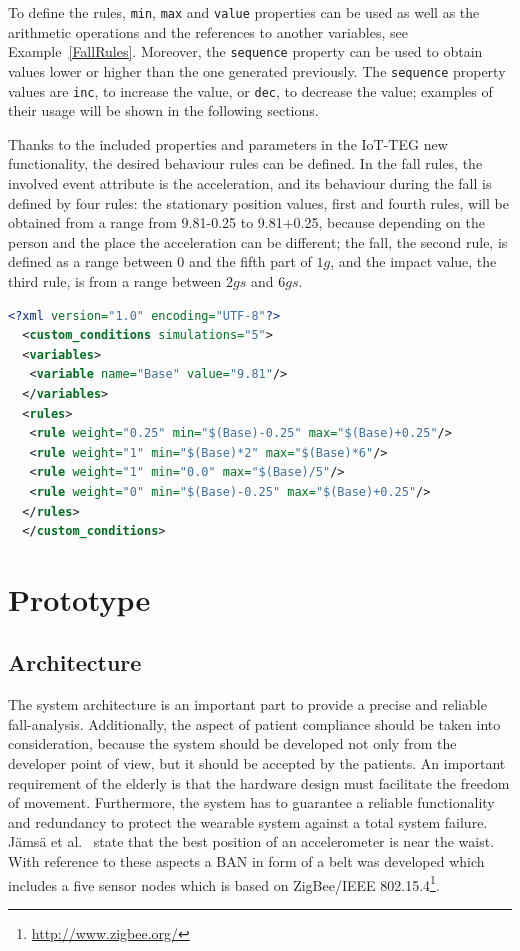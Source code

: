 \documentclass[journal]{IEEEtran}
\begin{document}
To define the rules, \texttt{\small{min}}, \texttt{\small{max}} and \texttt{\small{value}} properties can be used as well as the arithmetic 
operations and the references to another variables, see Example~\ref{FallRules}. Moreover, the \texttt{\small{sequence}} property can be used to obtain
values lower or higher than the one generated previously. The \texttt{\small{sequence}} property values are \texttt{\small{inc}}, 
to increase the value, or \texttt{\small{dec}}, to decrease the value; examples of their usage will be shown in the following
sections.

Thanks to the included properties and parameters in the IoT-TEG new functionality, the desired behaviour rules can
be defined. In the fall rules, the involved event attribute is the acceleration, and its behaviour during the 
fall is defined by four rules: the stationary position values, first and fourth rules, will be obtained from a range 
from 9.81-0.25 to 9.81+0.25, because depending on the person and the place the acceleration can be different; the fall, the second rule, 
is defined as a range between 0 and the fifth part of $1g$, and the impact value, the third rule, is from a range between $2gs$ and $6gs$.

\begin{lstlisting}[basicstyle=\ttfamily\scriptsize,language=XML,caption={Rules to define a fall},label=FallRules]
  <?xml version="1.0" encoding="UTF-8"?>
  <custom_conditions simulations="5">
  <variables>
   <variable name="Base" value="9.81"/>
  </variables>
  <rules>
   <rule weight="0.25" min="$(Base)-0.25" max="$(Base)+0.25"/>
   <rule weight="1" min="$(Base)*2" max="$(Base)*6"/>
   <rule weight="1" min="0.0" max="$(Base)/5"/>
   <rule weight="0" min="$(Base)-0.25" max="$(Base)+0.25"/>
  </rules>
  </custom_conditions>
\end{lstlisting}

\section{Prototype}
\label{sec:basicprototype}

\subsection{Architecture}
\label{sub:basicprototypearchitecture}

The system architecture is an important part to provide a precise and reliable fall-analysis. 
Additionally, the aspect of patient compliance should be taken into consideration, because the 
system should be developed not only from the developer point of view, but it should be accepted 
by the patients. An important requirement of the elderly is that the hardware design must 
facilitate the freedom of movement. Furthermore, the system has to guarantee a reliable 
functionality and redundancy to protect the wearable system against
a total system failure. J{\"a}ms{\"a} et al.~\cite{jamsa2014fall} state that the best
position of an accelerometer is near the waist.
With reference to these aspects a BAN in form of a belt was developed which 
includes a five sensor nodes which is based on ZigBee/IEEE 802.15.4\footnote{\url{http://www.zigbee.org/}}.
\end{document}
